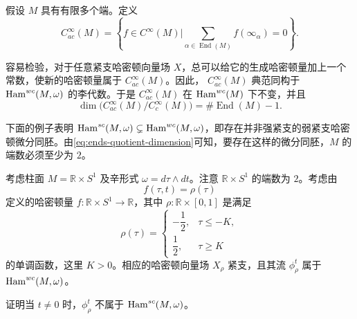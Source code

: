\begin{definition}\label{def:average-constant-at-ends}
假设 $M$ 具有有限多个端。定义
\[
 C_{ac}^\infty(M)
 =\left\{f\in C^\infty(M)\mathrel{\bigg|}
   \sum_{\alpha\in\operatorname{End}(M)}f(\infty_\alpha)=0\right\}.
\]
\end{definition}

容易检验，对于任意紧支哈密顿向量场 $X$，总可以给它的生成哈密顿量加上一个常数，使新的哈密顿量属于 $C_{ac}^\infty(M)$。因此，
$C_{ac}^\infty(M)$ 典范同构于 $\operatorname{Ham}^{wc}(M,\omega)$ 的李代数。于是
$C_{ac}^\infty(M)$ 在 $\operatorname{Ham}^{wc}(M)$ 下不变，并且
\begin{equation}
 \dim\bigl(C_{ac}^\infty(M)/C_c^\infty(M)\bigr)
 =\#\operatorname{End}(M)-1.
 \label{eq:ends-quotient-dimension}
\end{equation}

下面的例子表明
$\operatorname{Ham}^{sc}(M,\omega)\subsetneq\operatorname{Ham}^{wc}(M,\omega)$，即存在并非强紧支的弱紧支哈密顿微分同胚。由\eqref{eq:ends-quotient-dimension}可知，要存在这样的微分同胚，$M$ 的端数必须至少为 $2$。

\begin{example}\label{ex:cylinder-weak-not-strong}
考虑柱面 $M=\mathbb R\times S^1$ 及辛形式
$\omega=d\tau\wedge dt$。注意 $\mathbb R\times S^1$ 的端数为 $2$。考虑由
\[
 f(\tau,t)=\rho(\tau)
\]
定义的哈密顿量 $f:\mathbb R\times S^1\to\mathbb R$，其中
$\rho:\mathbb R\times[0,1]$ 是满足
\begin{equation}
 \rho(\tau)=
 \begin{cases}
  -\dfrac12,&\tau\leq-K,\\[0.3em]
   \dfrac12,&\tau\geq K
 \end{cases}
 \label{eq:cylinder-end-profile}
\end{equation}
的单调函数，这里 $K>0$。相应的哈密顿向量场 $X_\rho$ 紧支，且其流
$\phi_\rho^t$ 属于 $\operatorname{Ham}^{wc}(M,\omega)$。
\end{example}

\begin{exercise}\label{ex:cylinder-flow-not-strong}
证明当 $t\ne0$ 时，$\phi_\rho^t$ 不属于 $\operatorname{Ham}^{sc}(M,\omega)$。
\end{exercise}
